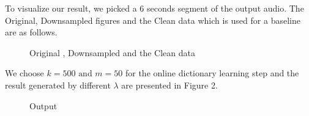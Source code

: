 \documentclass[UTF8]{article}
\begin{document}
To visualize our result, we picked a 6 seconds segment of the output audio.
The Original, Downsampled figures and the Clean data which is used for a baseline are as follows.
\begin{figure}[H]
    \centering
    \caption{Original , Downsampled and the Clean data}
\end{figure}



We choose $k = 500 \text{ and } m = 50$ for the online dictionary learning step and the result generated by different $\lambda$ are presented in Figure 2.


\begin{figure}[H]
    \centering
    \caption{Output}
\end{figure}



\nocite{*}
\end{document}
